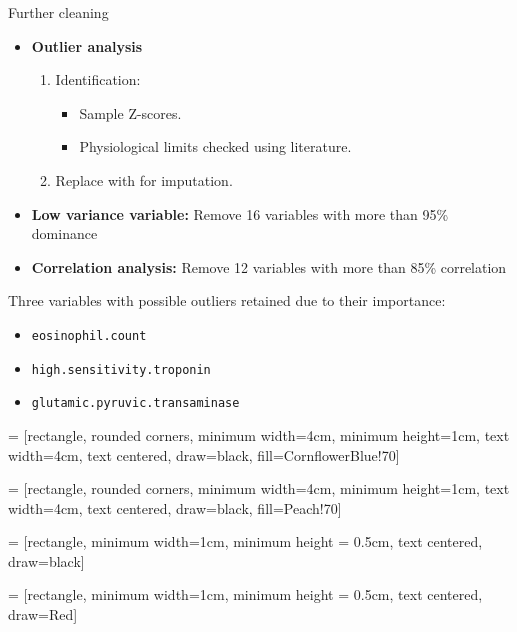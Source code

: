 \documentclass[aspectratio=169,xcolor=dvipsnames,handout]{beamer}
\begin{document}

\begin{frame}{Further cleaning}
\begin{itemize}
    \item \textbf{Outlier analysis}
    \begin{enumerate}
        \item Identification:
            \begin{itemize}
                \item Sample Z-scores.
                \item Physiological limits checked using literature.
            \end{itemize}
        \item Replace with  for imputation.
    \end{enumerate}
    \pause
    \item \textbf{Low variance variable:}
    Remove \alert{16} variables with more than \alert{95\% dominance}
    \pause
    \item \textbf{Correlation analysis:}
    Remove \alert{12} variables with more than \alert{85\% correlation}
\end{itemize}
\pause
Three variables with possible outliers retained due to their importance:
\begin{itemize}
    \item \texttt{eosinophil.count}
    \item \texttt{high.sensitivity.troponin}
    \item \texttt{glutamic.pyruvic.transaminase}
\end{itemize}

\end{frame}
 = [rectangle, rounded corners, 
minimum width=4cm, 
minimum height=1cm,
text width=4cm,
text centered, 
draw=black, 
fill=CornflowerBlue!70]

 = [rectangle, rounded corners, 
minimum width=4cm, 
minimum height=1cm,
text width=4cm,
text centered, 
draw=black, 
fill=Peach!70]

 = [rectangle, 
minimum width=1cm, 
minimum height = 0.5cm,
text centered, 
draw=black]

 = [rectangle, 
minimum width=1cm, 
minimum height = 0.5cm,
text centered, 
draw=Red]
\end{document}
